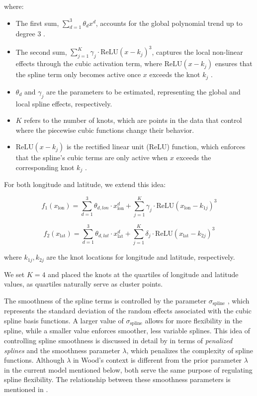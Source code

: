 \documentclass[12pt]{article}
\begin{document}
where:
\begin{itemize}
    \item The first sum, \( \sum_{d=1}^{3} \theta_d x^{d} \), accounts for the global polynomial trend up to degree 3 \parencite[][p. 162]{wood2017}.
    \item The second sum, \( \sum_{j=1}^{K} \gamma_j \cdot \text{ReLU}(x - k_j)^3 \), captures the local non-linear effects through the cubic activation term, where \( \text{ReLU}(x - k_j) \) ensures that the spline term only becomes active once \( x \) exceeds the knot \( k_j \) \parencite[][p. 164]{wood2017}.
    \item \( \theta_d \) and \( \gamma_j \) are the parameters to be estimated, representing the global and local spline effects, respectively.
    \item \( K \) refers to the number of knots, which are points in the data that control where the piecewise cubic functions change their behavior.
    \item \( \text{ReLU}(x - k_j) \) is the rectified linear unit (ReLU) function, which enforces that the spline's cubic terms are only active when \( x \) exceeds the corresponding knot \( k_j \) \parencite[][pp. 189--191]{goodfellow2016}.
\end{itemize}

For both longitude and latitude, we extend this idea:

\[
f_1(x_{\text{lon}}) = \sum_{d=1}^{3} \theta_{d,lon} \cdot x_{\text{lon}}^d + \sum_{j=1}^{K} \gamma_j \cdot \text{ReLU}(x_{\text{lon}} - k_{1j})^3
\]

\[
f_2(x_{\text{lat}}) = \sum_{d=1}^{3} \theta_{d, lat} \cdot x_{\text{lat}}^d + \sum_{j=1}^{K} \delta_j \cdot \text{ReLU}(x_{\text{lat}} - k_{2j})^3
\]

where \( k_{1j}, k_{2j} \) are the knot locations for longitude and latitude, respectively.

We set \( K = 4 \) and placed the knots at the quartiles of longitude and latitude values, as quartiles naturally serve as cluster points.

The smoothness of the spline terms is controlled by the parameter \( \sigma_{\text{spline}} \) \parencite{brms}, which represents the standard deviation of the random effects associated with the cubic spline basis functions. A larger value of \( \sigma_{\text{spline}} \) allows for more flexibility in the spline, while a smaller value enforces smoother, less variable splines. This idea of controlling spline smoothness is discussed in detail by \textcite{wood2017} in terms of \textit{penalized splines} and the smoothness parameter \( \lambda \), which penalizes the complexity of spline functions. Although \( \lambda \) in Wood's context is different from the prior parameter \( \lambda \) in the current model mentioned below, both serve the same purpose of regulating spline flexibility. The relationship between these smoothness parameters is mentioned in \textcite[][p. 246]{wood2023mgcv}.
\end{document}
